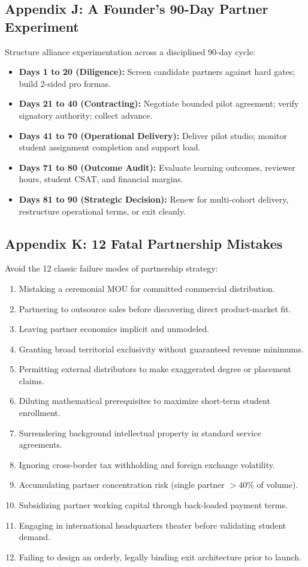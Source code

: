 \subsection*{Appendix J: A Founder's 90-Day Partner Experiment}
\label{sec:app_ninety_day_experiment}

Structure alliance experimentation across a disciplined 90-day cycle:
\begin{itemize}
\item \textbf{Days 1 to 20 (Diligence):} Screen candidate partners against hard gates; build 2-sided pro formas.
\item \textbf{Days 21 to 40 (Contracting):} Negotiate bounded pilot agreement; verify signatory authority; collect advance.
\item \textbf{Days 41 to 70 (Operational Delivery):} Deliver pilot studio; monitor student assignment completion and support load.
\item \textbf{Days 71 to 80 (Outcome Audit):} Evaluate learning outcomes, reviewer hours, student CSAT, and financial margins.
\item \textbf{Days 81 to 90 (Strategic Decision):} Renew for multi-cohort delivery, restructure operational terms, or exit cleanly.
\end{itemize}

\subsection*{Appendix K: 12 Fatal Partnership Mistakes}
\label{sec:app_twelve_fatal_mistakes}

Avoid the 12 classic failure modes of partnership strategy:
\begin{enumerate}
\item Mistaking a ceremonial MOU for committed commercial distribution.
\item Partnering to outsource sales before discovering direct product-market fit.
\item Leaving partner economics implicit and unmodeled.
\item Granting broad territorial exclusivity without guaranteed revenue minimums.
\item Permitting external distributors to make exaggerated degree or placement claims.
\item Diluting mathematical prerequisites to maximize short-term student enrollment.
\item Surrendering background intellectual property in standard service agreements.
\item Ignoring cross-border tax withholding and foreign exchange volatility.
\item Accumulating partner concentration risk (single partner $>40\%$ of volume).
\item Subsidizing partner working capital through back-loaded payment terms.
\item Engaging in international headquarters theater before validating student demand.
\item Failing to design an orderly, legally binding exit architecture prior to launch.
\end{enumerate}

